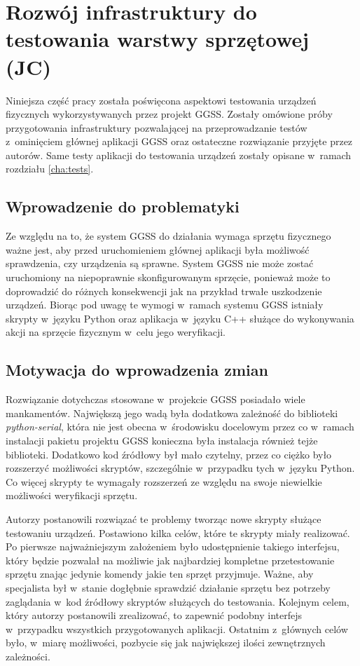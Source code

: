 \clearpage
\section{Rozwój infrastruktury do testowania warstwy sprzętowej (JC)}
\label{ch:hardware_testing}

Niniejsza część pracy została poświęcona aspektowi testowania urządzeń fizycznych wykorzystywanych przez projekt GGSS. Zostały omówione próby przygotowania infrastruktury pozwalającej na przeprowadzanie testów z~ominięciem głównej aplikacji GGSS oraz ostateczne rozwiązanie przyjęte przez autorów. Same testy aplikacji do testowania urządzeń zostały opisane w~ramach rozdziału \ref{cha:tests}.

\subsection{Wprowadzenie do problematyki}
Ze względu na to, że system GGSS do działania wymaga sprzętu fizycznego ważne jest, aby przed uruchomieniem głównej aplikacji była możliwość sprawdzenia, czy urządzenia są sprawne. System GGSS nie może zostać uruchomiony na niepoprawnie skonfigurowanym sprzęcie, ponieważ może to doprowadzić do różnych konsekwencji jak na przykład trwałe uszkodzenie urządzeń. Biorąc pod uwagę te wymogi w~ramach systemu GGSS istniały skrypty w~języku Python oraz aplikacja w~języku C++ służące do wykonywania akcji na sprzęcie fizycznym w~celu jego weryfikacji.

\subsection{Motywacja do wprowadzenia zmian}
Rozwiązanie dotychczas stosowane w~projekcie GGSS posiadało wiele mankamentów. Największą jego wadą była dodatkowa zależność do biblioteki \emph{python-serial}, która nie jest obecna w~środowisku docelowym przez co w~ramach instalacji pakietu projektu GGSS konieczna była instalacja również tejże biblioteki. Dodatkowo kod źródłowy był mało czytelny, przez co ciężko było rozszerzyć możliwości skryptów, szczególnie w~przypadku tych w~języku Python. Co więcej skrypty te wymagały rozszerzeń ze względu na swoje niewielkie możliwości weryfikacji sprzętu.

Autorzy postanowili rozwiązać te problemy tworząc nowe skrypty służące testowaniu urządzeń. Postawiono kilka celów, które te skrypty miały realizować. Po pierwsze najważniejszym założeniem było udostępnienie takiego interfejsu, który będzie pozwalał na możliwie jak najbardziej kompletne przetestowanie sprzętu znając jedynie komendy jakie ten sprzęt przyjmuje. Ważne, aby specjalista był w~stanie dogłębnie sprawdzić działanie sprzętu bez potrzeby zaglądania w~kod źródłowy skryptów służących do testowania. Kolejnym celem, który autorzy postanowili zrealizować, to zapewnić podobny interfejs w~przypadku wszystkich przygotowanych aplikacji. Ostatnim z~głównych celów było, w~miarę możliwości, pozbycie się jak największej ilości zewnętrznych zależności.

